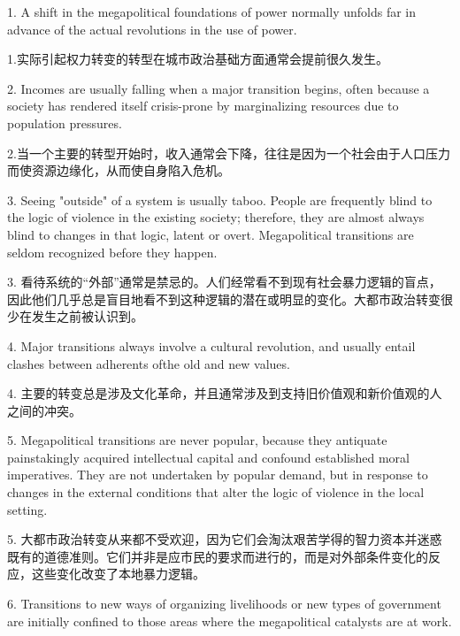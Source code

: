 \begin{Parallel}{97mm}{45mm}
  \ParallelLText
  {1. A shift in the megapolitical foundations of power normally unfolds far in advance of the actual revolutions in the use of power.}
  
  \ParallelRText
  {1.实际引起权力转变的转型在城市政治基础方面通常会提前很久发生。}
  \ParallelPar



  \ParallelLText
  {2. Incomes are usually falling when a major transition begins, often because a society has rendered itself crisis-prone by marginalizing resources due to population pressures.}
  
  \ParallelRText
  {2.当一个主要的转型开始时，收入通常会下降，往往是因为一个社会由于人口压力而使资源边缘化，从而使自身陷入危机。}
  \ParallelPar



  \ParallelLText
  {3. Seeing "outside" of a system is usually taboo. People are frequently blind to the logic of violence in the existing society; therefore, they are almost always blind to changes in that logic, latent or overt. Megapolitical transitions are seldom recognized before they happen.}
  
  \ParallelRText
  {3. 看待系统的“外部”通常是禁忌的。人们经常看不到现有社会暴力逻辑的盲点，因此他们几乎总是盲目地看不到这种逻辑的潜在或明显的变化。大都市政治转变很少在发生之前被认识到。}
  \ParallelPar



  \ParallelLText
  {4. Major transitions always involve a cultural revolution, and usually entail clashes between adherents ofthe old and new values.}
  
  \ParallelRText
  {4. 主要的转变总是涉及文化革命，并且通常涉及到支持旧价值观和新价值观的人之间的冲突。}
  \ParallelPar



  \ParallelLText
  {5. Megapolitical transitions are never popular, because they antiquate painstakingly acquired intellectual capital and confound established moral imperatives. They are not undertaken by popular demand, but in response to changes in the external conditions that alter the logic of violence in the local setting.}
  
  \ParallelRText
  {5. 大都市政治转变从来都不受欢迎，因为它们会淘汰艰苦学得的智力资本并迷惑既有的道德准则。它们并非是应市民的要求而进行的，而是对外部条件变化的反应，这些变化改变了本地暴力逻辑。}
  \ParallelPar



  \ParallelLText
  {6. Transitions to new ways of organizing livelihoods or new types of government are initially confined to those areas where the megapolitical catalysts are at work.}
  

\end{Parallel}
